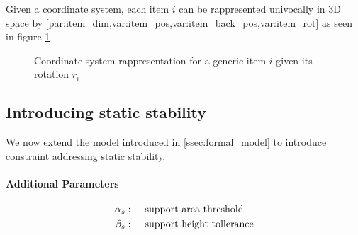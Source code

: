 Given a coordinate system, each item $i$ can be rappresented univocally in 3D space by \cref{par:item_dim,var:item_pos,var:item_back_pos,var:item_rot} as seen in figure \ref{fig:coordinate_system}
\begin{figure}
    \scalebox{0.65}{%
    
    }
    \caption{Coordinate system rappresentation for a generic item $i$ given its rotation $r_i$ 
    \label{fig:coordinate_system}}
\end{figure}

\subsection*{Introducing static stability}

We now extend the model introduced in \cref{ssec:formal_model} to introduce constraint addressing static stability.

\paragraph*{Additional Parameters}
\begin{align*}
    \alpha_s  :\hspace{.5cm}& \text{support area threshold} \\
    \beta_s  :\hspace{.5cm}& \text{support height tollerance} 
\end{align*}